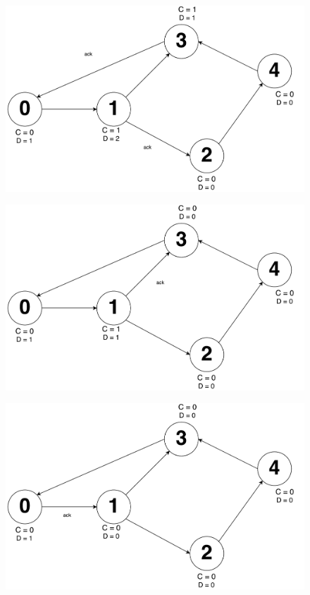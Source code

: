 \documentclass[times]{article}
\begin{document}
		\begin{figure}[H]
			\includegraphics[width=\linewidth]{q2/7.pdf}
		\end{figure}
		\begin{figure}[H]
			\includegraphics[width=\linewidth]{q2/8.pdf}
		\end{figure}
		\begin{figure}[H]
			\includegraphics[width=\linewidth]{q2/9.pdf}
		\end{figure}
\end{document}
